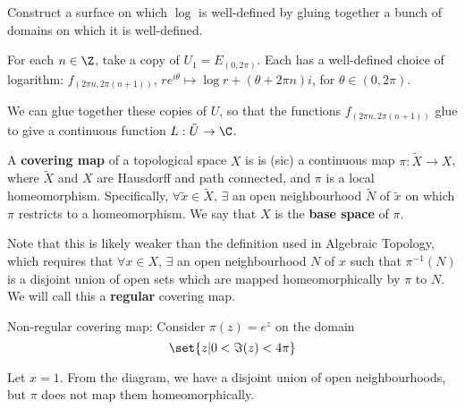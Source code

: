\documentclass{article}
\begin{document}
\begin{aim}
    Construct a surface on which $\log$ is well-defined by gluing together a bunch of domains on which it is well-defined.
\end{aim}

For each $n \in \Z$, take a copy of $U_1 = E_{(0, 2\pi)}$.  Each has a well-defined choice of logarithm: $f_{(2\pi n, 2\pi (n+1))}$, $r e^{i \theta} \mapsto \log r + (\theta + 2 \pi n) i$, for $\theta \in (0, 2\pi)$.

We can glue together these copies of $U$, so that the functions $f_{(2\pi n, 2\pi (n+1))}$ glue to give a continuous function $L : \tilde{U} \to \C$.

\begin{defi}
    A \textbf{covering map} of a topological space $X$ is is (sic) a continuous map $\pi: \widetilde X \to X$, where $\widetilde X$ and $X$ are Hausdorff and path connected, and $\pi$ is a local homeomorphism.  Specifically, $\forall \widetilde x \in \widetilde X$, $\exists$ an open neighbourhood $\widetilde N$ of $\widetilde{x}$ on which $\pi$ restricts to a homeomorphism.
    We say that $X$ is the \textbf{base space} of $\pi$.
\end{defi}
Note that this is likely weaker than the definition used in Algebraic Topology, which requires that $\forall x \in X$, $\exists$ an open neighbourhood $N$ of $x$ such that $\pi^{-1}(N)$ is a disjoint union of open sets which are mapped homeomorphically by $\pi$ to $N$.  We will call this a \textbf{regular} covering map.

\begin{eg}
    Non-regular covering map: Consider $\pi(z) = e^z$ on the domain
    \begin{equation}
        \set{z | 0 < \Im(z) < 4\pi}
    \end{equation}

    Let $x = 1$.  From the diagram, we have a disjoint union of open neighbourhoods, but $\pi$ does not map them homeomorphically.
\end{eg}
\end{document}
